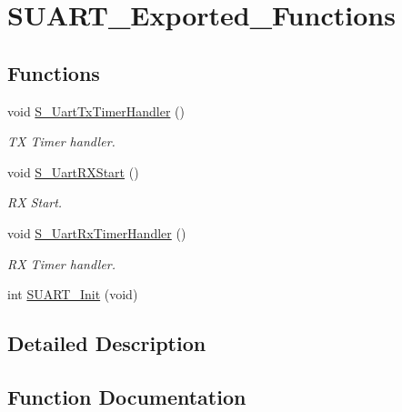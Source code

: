 \hypertarget{group___s_u_a_r_t___exported___functions}{}\section{S\+U\+A\+R\+T\+\_\+\+Exported\+\_\+\+Functions}
\label{group___s_u_a_r_t___exported___functions}
\subsection*{Functions}
\begin{DoxyCompactItemize}
\item 
void \mbox{\hyperlink{group___s_u_a_r_t___exported___functions_gaf0674055c3083cfcf4e20633f1deabb2}{S\+\_\+\+Uart\+Tx\+Timer\+Handler}} ()
\begin{DoxyCompactList}\small\item\em TX Timer handler. \end{DoxyCompactList}\item 
void \mbox{\hyperlink{group___s_u_a_r_t___exported___functions_ga2de0a2047cfba22db54132164576cc18}{S\+\_\+\+Uart\+R\+X\+Start}} ()
\begin{DoxyCompactList}\small\item\em RX Start. \end{DoxyCompactList}\item 
void \mbox{\hyperlink{group___s_u_a_r_t___exported___functions_gab302ede121d8fa7a6452427523b1ffeb}{S\+\_\+\+Uart\+Rx\+Timer\+Handler}} ()
\begin{DoxyCompactList}\small\item\em RX Timer handler. \end{DoxyCompactList}\item 
int \mbox{\hyperlink{group___s_u_a_r_t___exported___functions_ga4905cf58b8ed4c083969f3f9131e38ff}{S\+U\+A\+R\+T\+\_\+\+Init}} (void)
\end{DoxyCompactItemize}


\subsection{Detailed Description}


\subsection{Function Documentation}
\mbox{\label{group___s_u_a_r_t___exported___functions_ga2de0a2047cfba22db54132164576cc18}} 
